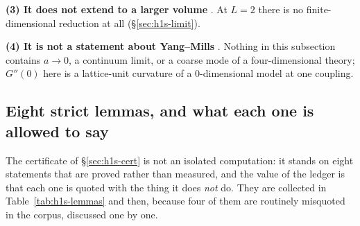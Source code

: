 \textbf{(3) It does not extend to a larger volume} \LN. At $L=2$ there is no finite-dimensional
reduction at all (\S\ref{sec:h1s-limit}).

\textbf{(4) It is not a statement about Yang--Mills} \LN. Nothing in this subsection contains $a\to0$,
a continuum limit, or a coarse mode of a four-dimensional theory; $G''(0)$ here is a lattice-unit
curvature of a $0$-dimensional model at one coupling.


\subsection{Eight strict lemmas, and what each one is allowed to say}
\label{sec:h1s-lemmas}

The certificate of \S\ref{sec:h1s-cert} is not an isolated computation: it stands on eight statements
that are proved rather than measured, and the value of the ledger is that each one is quoted with the
thing it does \emph{not} do. They are collected in Table~\ref{tab:h1s-lemmas} and then, because four of
them are routinely misquoted in the corpus, discussed one by one.

